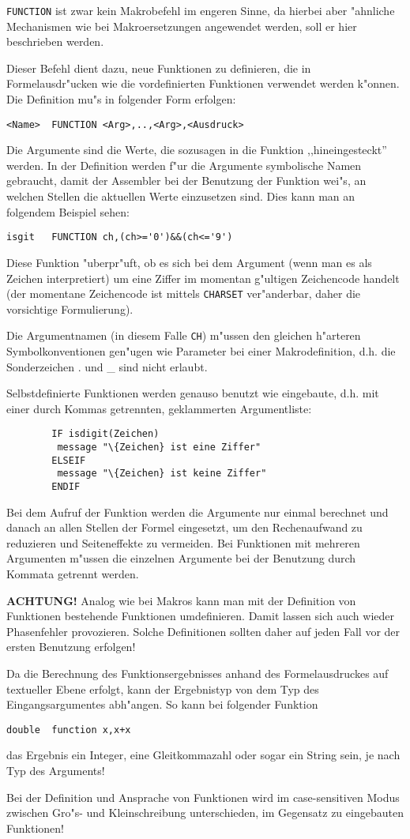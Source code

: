 \documentclass[12pt,a4paper,twoside]{report}
\newcommand{\bb}[1]{{\bf #1}}
\newcommand{\tty}[1]{{\tt #1}}
\begin{document}
{\tty{FUNCTION} ist zwar kein Makrobefehl im engeren Sinne, da 
hierbei aber "ahnliche Mechanismen wie bei Makroersetzungen 
angewendet werden, soll er hier beschrieben werden.
\par
Dieser Befehl dient dazu, neue Funktionen zu definieren, die in
Formel\-ausdr"ucken wie die vordefinierten Funktionen verwendet werden
k"onnen.  Die Definition mu"s in folgender Form erfolgen:
\begin{verbatim}
<Name>  FUNCTION <Arg>,..,<Arg>,<Ausdruck>
\end{verbatim}
Die Argumente sind die Werte, die sozusagen in die Funktion
,,hineingesteckt'' werden.  In der Definition werden f"ur die Argumente
symbolische Namen gebraucht, damit der Assembler bei der Benutzung
der Funktion wei"s, an welchen Stellen die aktuellen Werte einzusetzen
sind. Dies kann man an folgendem Beispiel sehen:
\begin{verbatim}
isgit   FUNCTION ch,(ch>='0')&&(ch<='9')
\end{verbatim}
Diese Funktion "uberpr"uft, ob es sich bei dem Argument (wenn man es
als Zeichen interpretiert) um eine Ziffer im momentan g"ultigen
Zeichencode handelt (der momentane Zeichencode ist mittels \tty{CHARSET}
ver"anderbar, daher die vorsichtige Formulierung).
\par
Die Argumentnamen (in diesem Falle \tty{CH}) m"ussen den gleichen h"arteren
Symbolkonventionen gen"ugen wie Parameter bei einer Makrodefinition,
d.h. die Sonderzeichen . und \_ sind nicht erlaubt.
\par
Selbstdefinierte Funktionen werden genauso benutzt wie eingebaute,
d.h. mit einer durch Kommas getrennten, geklammerten Argumentliste:
\begin{verbatim}
        IF isdigit(Zeichen)
         message "\{Zeichen} ist eine Ziffer"
        ELSEIF
         message "\{Zeichen} ist keine Ziffer"
        ENDIF
\end{verbatim}
\par
Bei dem Aufruf der Funktion werden die Argumente nur einmal berechnet
und danach an allen Stellen der Formel eingesetzt, um den
Rechenaufwand zu reduzieren und Seiteneffekte zu vermeiden.
Bei Funktionen mit mehreren Argumenten m"ussen die einzelnen Argumente
bei der Benutzung durch Kommata getrennt werden.
\par
\bb{ACHTUNG!} Analog wie bei Makros kann man mit der Definition von 
Funktionen bestehende Funktionen umdefinieren.  Damit lassen sich auch 
wieder Phasenfehler provozieren.  Solche Definitionen sollten daher auf
jeden Fall vor der ersten Benutzung erfolgen!
\par
Da die Berechnung des Funktionsergebnisses anhand des Formelausdruckes
auf textueller Ebene erfolgt, kann der Ergebnistyp von dem Typ des
Eingangsargumentes abh"angen.  So kann bei folgender Funktion
\begin{verbatim}
double  function x,x+x
\end{verbatim}
das Ergebnis ein Integer, eine Gleitkommazahl oder sogar ein String
sein, je nach Typ des Arguments!
\par
Bei der Definition und Ansprache von Funktionen wird im case-sensitiven
Modus zwischen Gro"s- und Kleinschreibung unterschieden, im Gegensatz
zu eingebauten Funktionen!

}
\end{document}

